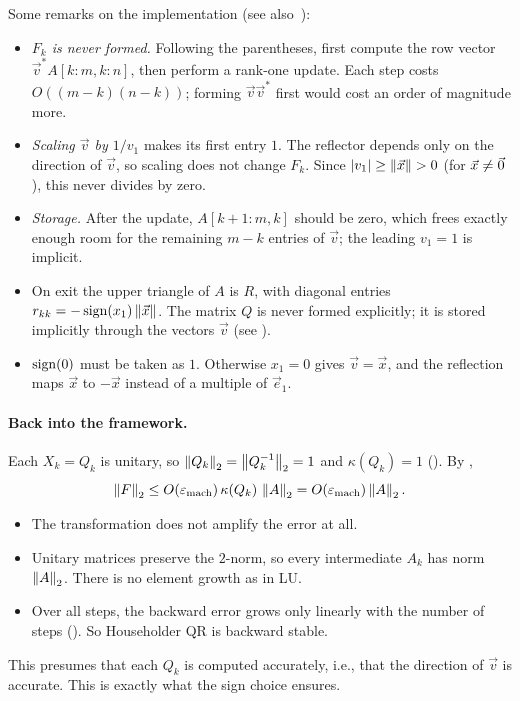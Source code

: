 Some remarks on the implementation (see also~\cite[Lecture 10]{TB}):
\begin{itemize}
  \item \emph{$F_k$ is never formed.} Following the parentheses, first compute the row vector $\vec{v}^\ast A[k{:}m, k{:}n]$, then perform a rank-one update. Each step costs $O((m - k)(n - k))$; forming $\vec{v}\vec{v}^\ast$ first would cost an order of magnitude more.
  \item \emph{Scaling $\vec{v}$ by $1/v_1$} makes its first entry $1$. The reflector depends only on the direction of $\vec{v}$, so scaling does not change $F_k$. Since $\left\lvert v_1 \right\rvert \ge \left\lVert \vec{x} \right\rVert > 0$ (for $\vec{x} \ne \vec{0}$), this never divides by zero.
  \item \emph{Storage.} After the update, $A[k{+}1{:}m, k]$ should be zero, which frees exactly enough room for the remaining $m - k$ entries of $\vec{v}$; the leading $v_1 = 1$ is implicit.
  \item On exit the upper triangle of $A$ is $R$, with diagonal entries $r_{kk} = -\operatorname{sign}(x_1)\left\lVert \vec{x} \right\rVert$. The matrix $Q$ is never formed explicitly; it is stored implicitly through the vectors $\vec{v}$ (see ).
  \item $\operatorname{sign}(0)$ must be taken as $1$. Otherwise $x_1 = 0$ gives $\vec{v} = \vec{x}$, and the reflection maps $\vec{x}$ to $-\vec{x}$ instead of a multiple of $\vec{e}_1$.
\end{itemize}

\paragraph{Back into the framework.} Each $X_k = Q_k$ is unitary, so $\left\lVert Q_k \right\rVert_2 = \left\lVert Q_k^{-1} \right\rVert_2 = 1$ and $\kappa(Q_k) = 1$ (). By ,
\begin{equation}
  \left\lVert F \right\rVert_2 \le O(\varepsilon_{\mathrm{mach}})\,\kappa(Q_k)\,\left\lVert A \right\rVert_2 = O(\varepsilon_{\mathrm{mach}})\left\lVert A \right\rVert_2.
\end{equation}
\begin{itemize}
  \item The transformation does not amplify the error at all.
  \item Unitary matrices preserve the $2$-norm, so every intermediate $A_k$ has norm $\left\lVert A \right\rVert_2$. There is no element growth as in LU.
  \item Over all steps, the backward error grows only linearly with the number of steps (). So Householder QR is backward stable.
\end{itemize}
This presumes that each $Q_k$ is computed accurately, i.e., that the direction of $\vec{v}$ is accurate. This is exactly what the sign choice ensures.

